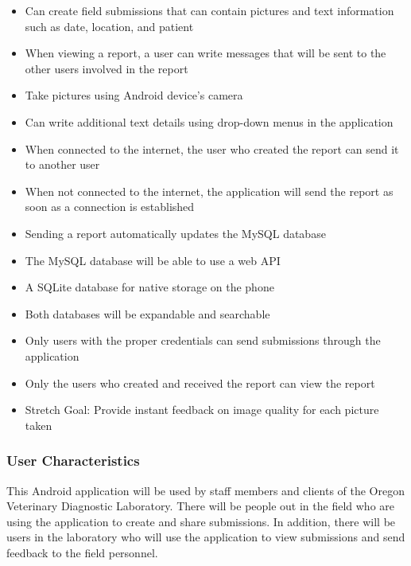 \documentclass[onecolumn, draftclsnofoot,10pt, compsoc]{IEEEtran}
\begin{document}
\begin{itemize}

\item Can create field submissions that can contain pictures and text information such as date, location, and patient

\item When viewing a report, a user can write messages that will be sent to the other users involved in the report

\item Take pictures using Android device's camera

\item Can write additional text details using drop-down menus in the application 

\item When connected to the internet, the user who created the report can send it to another user

\item When not connected to the internet, the application will send the report as soon as a connection is established

\item Sending a report automatically updates the MySQL database

\item The MySQL database will be able to use a web API

\item A SQLite database for native storage on the phone

\item Both databases will be expandable and searchable

\item Only users with the proper credentials can send submissions through the application

\item Only the users who created and received the report can view the report

\item Stretch Goal: Provide instant feedback on image quality for each picture taken

\end{itemize}

\subsubsection{User Characteristics}
This Android application will be used by staff members and clients of the Oregon Veterinary Diagnostic Laboratory. 
There will be people out in the field who are using the application to create and share submissions. 
In addition, there will be users in the laboratory who will use the application to view submissions and send feedback to the field personnel.
\end{document}
